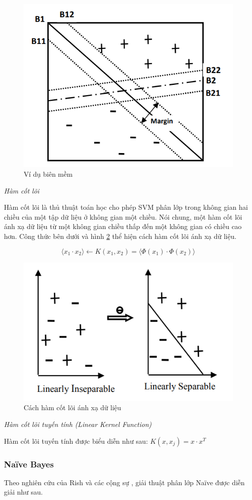 \begin{figure}[ht!]
	\centering
	\includegraphics[width=0.5\linewidth]{fig/svm-soft-margin.png}
	\caption{Ví dụ biên mềm}
	\label{fig:svm-soft-margin}
\end{figure}

\textit{Hàm cốt lõi}

Hàm cốt lõi là thủ thuật toán học cho phép SVM phân lớp trong không gian hai chiều của một tập dữ liệu ở không gian một chiều. Nói chung, một hàm cốt lõi ánh xạ dữ liệu từ một không gian chiều thấp đến một không gian có chiều cao hơn. Công thức bên dưới và hình \ref{fig:svm-kernel} thể hiện cách hàm cốt lõi ánh xạ dữ liệu.

\[ \langle x_1 \cdot x_2 \rangle \leftarrow K(x_1,x_2) = \langle \Phi(x_1) \cdot \Phi(x_2) \rangle \]

 \begin{figure}[ht!]
 	\centering
	\includegraphics[width=0.5\linewidth]{fig/svm-kernel.png}
	\caption{Cách hàm cốt lõi ánh xạ dữ liệu}
	\label{fig:svm-kernel}
\end{figure}

\textit{Hàm cốt lõi tuyến tính (Linear Kernel Function)}

Hàm cốt lõi tuyến tính được biểu diễn như sau: \( K(x, x_j) = x \cdot x^T\)

\subsubsection{Naïve Bayes}

Theo nghiên cứu của Rish và các cộng sự \cite{71-Rish}, giải thuật phân lớp Naïve được diễn giải như sau.

